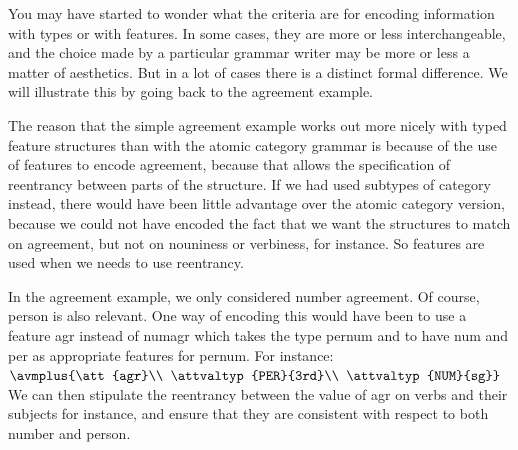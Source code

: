 \documentclass[12pt]{report}
\begin{document}
You may have started to wonder what the criteria are for encoding information
with types or with features.  
In some cases, they are more or less interchangeable,
and the choice made by a particular grammar writer may be
more or less a matter of aesthetics.  But in a lot of cases
there is a distinct formal difference.  
We will illustrate this by going back to
the agreement example.

The reason that the simple agreement 
example works out more nicely with typed feature structures than with the
atomic category grammar is because of the use of features to encode
agreement, because that allows the specification of reentrancy between
parts of the structure.  If we had used subtypes of category 
instead, there would have been 
little advantage over
the atomic category version, because we could not have encoded the fact 
that we
want the structures to match on agreement, but not on nouniness or verbiness,
for instance.  
So features are used when we needs to use reentrancy.

In the agreement example, we only considered number agreement.  Of course,
person is also relevant.  
One way of encoding this would have been to use a feature 
{\feature agr} instead of {\feature numagr}
which takes the type {\type pernum}
and to have {\feature num} and {\feature per}
as appropriate features for {\type pernum}.
For instance:\\
{\tiny $\avmplus{\att{agr}\\ 
\attvaltyp{PER}{3rd}\\  
\attvaltyp{NUM}{sg}}$}\\
We can then stipulate the reentrancy between the value of  
{\feature agr} on verbs and their
subjects for instance, and ensure that they are consistent with respect to both
number and person.
\end{document}
